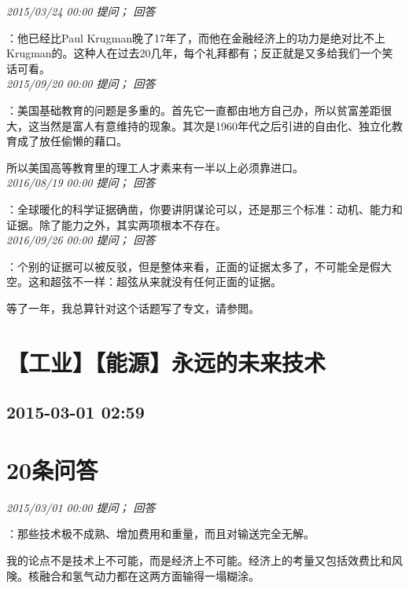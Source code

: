 \documentclass[twocolumn]{ctexart}
\begin{document}
\textit{\hfill\noindent\small 2015/03/24 00:00 提问； 回答}

：他已经比Paul Krugman晚了17年了，而他在金融经济上的功力是绝对比不上Krugman的。这种人在过去20几年，每个礼拜都有；反正就是又多给我们一个笑话可看。\\

\textit{\hfill\noindent\small 2015/09/20 00:00 提问； 回答}

：美国基础教育的问题是多重的。首先它一直都由地方自己办，所以贫富差距很大，这当然是富人有意维持的现象。其次是1960年代之后引进的自由化、独立化教育成了放任偷懒的藉口。

所以美国高等教育里的理工人才素来有一半以上必须靠进口。\\

\textit{\hfill\noindent\small 2016/08/19 00:00 提问； 回答}

：全球暖化的科学证据确凿，你要讲阴谋论可以，还是那三个标准：动机、能力和证据。除了能力之外，其实两项根本不存在。\\

\textit{\hfill\noindent\small 2016/09/26 00:00 提问； 回答}

：个别的证据可以被反驳，但是整体来看，正面的证据太多了，不可能全是假大空。这和超弦不一样：超弦从来就没有任何正面的证据。

等了一年，我总算针对这个话题写了专文，请参閲。\\


\section{【工业】【能源】永远的未来技术}
\subsection{2015-03-01 02:59}


\section{20条问答}

\textit{\hfill\noindent\small 2015/03/01 00:00 提问； 回答}

：那些技术极不成熟、增加费用和重量，而且对输送完全无解。

我的论点不是技术上不可能，而是经济上不可能。经济上的考量又包括效费比和风険。核融合和氢气动力都在这两方面输得一塌糊涂。\\
\end{document}
